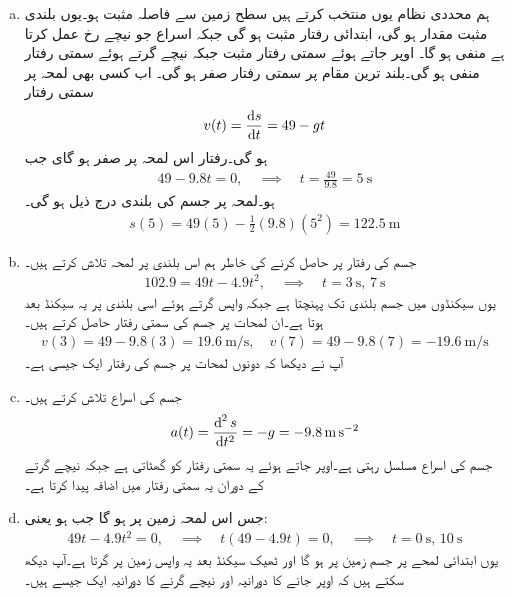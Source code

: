 \begin{enumerate}[a.]
\item
ہم محددی نظام یوں منتخب کرتے ہیں سطح زمین سے فاصلہ مثبت ہو۔یوں  بلندی  مثبت مقدار ہو گی،  ابتدائی رفتار مثبت ہو گی جبکہ اسراع جو نیچے رخ عمل کرتا ہے منفی ہو گا۔ اوپر جاتے ہوئے سمتی رفتار مثبت جبکہ نیچے گرتے ہوئے سمتی رفتار منفی ہو گی۔بلند ترین مقام پر سمتی رفتار صفر ہو گی۔ اب کسی بھی لمحہ پر سمتی رفتار
\begin{align*}
v(t)=\frac{\dif s}{\dif t}=49-gt
\end{align*}
ہو گی۔رفتار اس لمحہ پر صفر ہو گای جب 
\begin{align*}
49-9.8t=0,\quad \implies \quad t=\frac{49}{9.8}=\SI{5}{\second}
\end{align*} 
ہو۔لمحہ  پر جسم کی بلندی درج ذیل ہو گی۔
\begin{align*}
s(5)=49(5)-\frac{1}{2}(9.8)(5^2)=\SI{122.5}{\meter}
\end{align*}
\item
جسم کی رفتار  پر حاصل کرنے کی خاطر ہم اس بلندی پر لمحہ  تلاش کرتے ہیں۔
\begin{align*}
102.9=49t-4.9t^2,\quad \implies \quad t=\SI{3}{\second},\,\SI{7}{\second}
\end{align*}
یوں  سیکنڈوں میں جسم  بلندی تک پہنچتا ہے جبکہ واپس گرتے ہوئے اسی بلندی پر یہ  سیکنڈ بعد ہوتا ہے۔ان لمحات پر جسم کی سمتی رفتار حاصل کرتے ہیں۔
\begin{align*}
v(3)=49-9.8(3)=\SI{19.6}{\meter\per\second},\quad v(7)=49-9.8(7)=\SI{-19.6}{\meter\per\second}
\end{align*}
آپ نے دیکھا کہ دونوں لمحات پر جسم کی رفتار ایک جیسی ہے۔
\item
جسم کی اسراع تلاش کرتے ہیں۔
\begin{align*}
a(t)=\frac{\dif^{\,2}s}{\dif t^2}=-g=\SI{-9.8}{\meter\per\second\squared}
\end{align*}
جسم کی اسراع مسلسل  رہتی ہے۔اوپر جاتے ہوئے یہ سمتی رفتار کو گھٹاتی ہے جبکہ نیچے گرتے کے دوران یہ سمتی رفتار میں اضافہ پیدا کرتا ہے۔ 
\item
جس اس لمحہ زمین پر ہو گا جب  ہو یعنی:
\begin{align*}
49t-4.9t^2=0,\quad \implies \quad t(49-4.9t)=0,\quad \implies \quad t=\SI{0}{\second}, \, \SI{10}{\second}
\end{align*}
یوں ابتدائی لمحے پر جسم زمین پر ہو گا اور ٹھیک  سیکنڈ بعد یہ واپس زمین پر گرتا ہے۔آپ دیکھ سکتے ہیں کہ اوپر جانے کا دورانیہ اور نیچے گرنے کا دورانیہ ایک جیسے ہیں۔
\end{enumerate}
